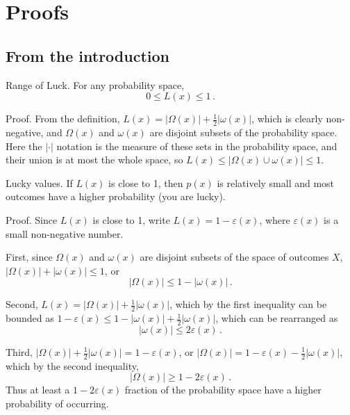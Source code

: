 \chapter*{Proofs}


\section{From the introduction}

\begin{theorem}{Range of Luck.} 
For any probability space,
\begin{equation}
0 \leq L(x) \leq 1 \,.
\end{equation}

Proof.  From the definition, $L(x)=|\Omega(x)|+\frac{1}{2} |\omega(x)|$, which is clearly non-negative, and $\Omega(x)$ and $\omega(x)$ are disjoint subsets of the probability space.  Here the $| \cdot |$ notation is the measure of these sets in the probability space, and their union is at most the whole space, so $L(x) \leq |\Omega(x) \cup \omega(x)| \leq 1$.
\end{theorem}

\begin{theorem}{Lucky values.}
If $L(x)$ is close to 1, then $p(x)$ is relatively small and most outcomes have a higher probability (you are lucky).

Proof.  Since $L(x)$ is close to 1, write $L(x)=1-\varepsilon(x)$, where $\varepsilon(x)$ is a small non-negative number.

First, since $\Omega(x)$ and $\omega(x)$ are disjoint subsets of the space of outcomes $X$, $|\Omega(x)|+|\omega(x)| \leq 1$, or 
\begin{equation*}
|\Omega(x)| \leq 1-|\omega(x)| \,.
\end{equation*}

Second, $L(x)=|\Omega(x)|+\frac{1}{2}|\omega(x)|$, which by the first inequality can be bounded as $1-\varepsilon(x)\leq  1-|\omega(x)|+\frac{1}{2}|\omega(x)|$, which can be rearranged as
\begin{equation*}
|\omega(x)| \leq 2 \varepsilon(x) \,.
\end{equation*}

Third, $|\Omega(x)|+\frac{1}{2}|\omega(x)| = 1-\varepsilon(x)$, or $|\Omega(x)|=1-\varepsilon(x)-\frac{1}{2}|\omega(x)|$, which by the second inequality,
\begin{equation}
|\Omega(x)| \geq 1-2 \varepsilon(x) \,.
\end{equation}
Thus at least a $1-2 \varepsilon(x)$ fraction of the probability space have a higher probability of occurring.
\end{theorem}


